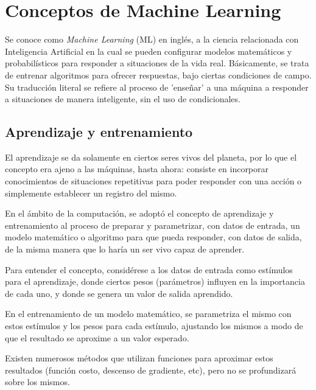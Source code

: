 \documentclass[a4paper,12pt,oneside,spanish]{book}
\begin{document}
\newpage	
\section{Conceptos de Machine Learning}\label{machinelearning}

Se conoce como \textit{Machine Learning} (ML) en inglés, a la ciencia relacionada con Inteligencia Artificial en la cual se pueden configurar modelos matemáticos y probabilísticos para responder a situaciones de la vida real. Básicamente, se trata de entrenar algoritmos para ofrecer respuestas, bajo ciertas condiciones de campo. Su traducción literal se refiere al proceso de 'enseñar' a una máquina a responder a situaciones de manera inteligente, sin el uso de condicionales.\par
	
\subsection{Aprendizaje y entrenamiento}
El aprendizaje se da solamente en ciertos seres vivos del planeta, por lo que el concepto era ajeno a las máquinas, hasta ahora: consiste en incorporar conocimientos de situaciones repetitivas para poder responder con una acción o simplemente establecer un registro del mismo.\par

En el ámbito de la computación, se adoptó el concepto de aprendizaje y entrenamiento al proceso de preparar y parametrizar, con datos de entrada, un modelo matemático o algoritmo para que pueda responder, con datos de salida, de la misma manera que lo haría un ser vivo capaz de aprender.\par

Para entender el concepto, considérese a los datos de entrada como estímulos para el aprendizaje, donde ciertos pesos (parámetros) influyen en la importancia de cada uno, y donde se genera un valor de salida aprendido.\par

En el entrenamiento de un modelo matemático, se parametriza el mismo con estos estímulos y los pesos para cada estímulo, ajustando los mismos a modo de que el resultado se aproxime a un valor esperado.  \par

Existen numerosos métodos que utilizan funciones para aproximar estos resultados (función costo, descenso de gradiente, etc), pero no se profundizará sobre los mismos. \par
\end{document}
